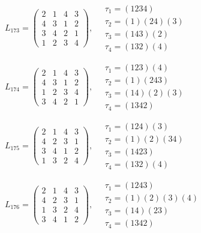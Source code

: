 $L_{173} = \begin{pmatrix} 2 & 1 & 4 & 3 \\ 4 & 3 & 1 & 2 \\ 3 & 4 & 2 & 1 \\ 1 & 2 & 3 & 4 \end{pmatrix}, \quad \begin{matrix} \tau_{1} = (1 2 3 4) \\ \tau_{2} = (1)(2 4)(3) \\ \tau_{3} = (1 4 3)(2) \\ \tau_{4} = (1 3 2)(4) \end{matrix}$

$L_{174} = \begin{pmatrix} 2 & 1 & 4 & 3 \\ 4 & 3 & 1 & 2 \\ 1 & 2 & 3 & 4 \\ 3 & 4 & 2 & 1 \end{pmatrix}, \quad \begin{matrix} \tau_{1} = (1 2 3)(4) \\ \tau_{2} = (1)(2 4 3) \\ \tau_{3} = (1 4)(2)(3) \\ \tau_{4} = (1 3 4 2) \end{matrix}$

$L_{175} = \begin{pmatrix} 2 & 1 & 4 & 3 \\ 4 & 2 & 3 & 1 \\ 3 & 4 & 1 & 2 \\ 1 & 3 & 2 & 4 \end{pmatrix}, \quad \begin{matrix} \tau_{1} = (1 2 4)(3) \\ \tau_{2} = (1)(2)(3 4) \\ \tau_{3} = (1 4 2 3) \\ \tau_{4} = (1 3 2)(4) \end{matrix}$

$L_{176} = \begin{pmatrix} 2 & 1 & 4 & 3 \\ 4 & 2 & 3 & 1 \\ 1 & 3 & 2 & 4 \\ 3 & 4 & 1 & 2 \end{pmatrix}, \quad \begin{matrix} \tau_{1} = (1 2 4 3) \\ \tau_{2} = (1)(2)(3)(4) \\ \tau_{3} = (1 4)(2 3) \\ \tau_{4} = (1 3 4 2) \end{matrix}$

